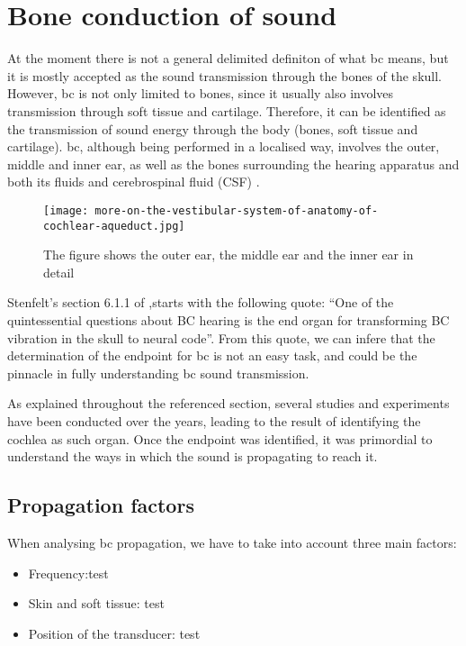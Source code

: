 \section{Bone conduction of sound}
At the moment there is not a general delimited definiton of what \gls{bc} means, but it is mostly accepted as the sound transmission through the bones of the skull. However, \gls{bc} is not only limited to bones, since it usually also involves transmission through soft tissue and cartilage. Therefore, it can be identified as the transmission of sound energy through the body (bones, soft tissue and cartilage). 
\gls{bc}, although being performed in a localised way, involves the outer, middle and inner ear, as well as the bones surrounding the hearing apparatus and both its fluids and cerebrospinal fluid (CSF) \citep{puria_2013}.
 \begin{figure}[H]
	\centering
		\texttt{[image: more-on-the-vestibular-system-of-anatomy-of-cochlear-aqueduct.jpg]}
		\caption{The figure shows the outer ear, the middle ear and the inner ear in detail}
		\label{fig:hearing_system_detail}
\end{figure}
Stenfelt's section 6.1.1 of \citep{puria_2013},starts with the following quote: \enquote{One of the quintessential questions about BC hearing is the end organ for
transforming BC vibration in the skull to neural code}. From this quote, we can infere that the determination of the endpoint for \gls{bc} is not an easy task, and could be the pinnacle in fully understanding \gls{bc} sound transmission.

As explained throughout the referenced section, several studies and experiments have been conducted over the years, leading to the result of identifying the cochlea as such organ. Once the endpoint was identified, it was primordial to understand the ways in which the sound is propagating to reach it.
\subsection{Propagation factors}
When analysing \gls{bc} propagation, we have to take into account three main factors:
\begin{itemize}
\item Frequency:test
\item Skin and soft tissue: test
\item Position of the transducer: test
\end{itemize}
